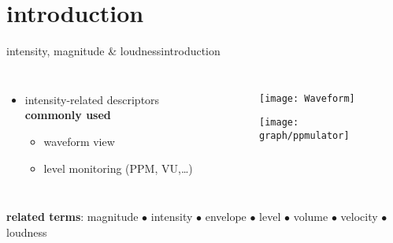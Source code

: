    \section[intro]{introduction}
        \begin{frame}{intensity, magnitude \& loudness}{introduction}
            \begin{columns}
                \begin{itemize}
                    \item   intensity-related descriptors \textbf{commonly used}
                        \begin{itemize}
                            \item	waveform view
                            
                            \item	level monitoring (PPM, VU,\ldots)
                            
                         \end{itemize}
                \end{itemize}
                \begin{figure}%
                    \texttt{[image: Waveform]}%

                    \vspace{8mm}
                    \texttt{[image: graph/ppmulator]}%
                \end{figure}
            \end{columns}
            \pause
            \bigskip
            \bigskip
            \bigskip
            \textbf{related terms}: magnitude $\bullet$ intensity $\bullet$ envelope $\bullet$ level $\bullet$ volume $\bullet$ velocity $\bullet$ loudness
            
        \end{frame}

